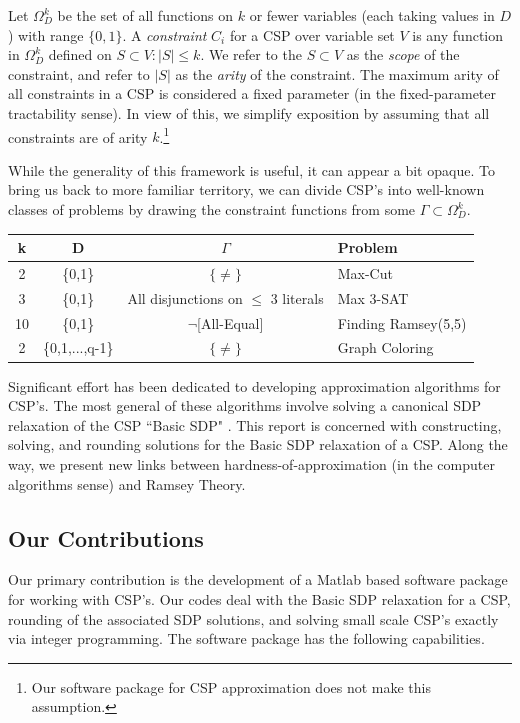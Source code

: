 \documentclass[12pt]{article} %
\begin{document}
Let $\Omega_D^k$ be the set of all functions on $k$ or fewer variables (each taking values in $D$) with range $\{ 0,1 \}$. A \textit{constraint} $C_i$ for a CSP over variable set $V$ is any function in $\Omega_D^k$ defined on $S \subset V : |S| \leq k$. We refer to the $S \subset V$ as the \textit{scope} of the constraint, and refer to $|S|$ as the \textit{arity} of the constraint. The maximum arity of all constraints in a CSP is considered a fixed parameter (in the fixed-parameter tractability sense). In view of this, we simplify exposition by assuming that all constraints are of arity $k$.\footnote{Our software package for CSP approximation does not make this assumption.}

While the generality of this framework is useful, it can appear a bit opaque. To bring us back to more familiar territory, we can divide CSP's into well-known classes of problems by drawing the constraint functions from some $\Gamma \subset \Omega_D^k$.

\begin{center}
\begin{tabular}{c c c l}
\hline
k & D & $\Gamma$ & Problem \\
\hline
2  & \{0,1\} & $\{\neq\}$ & Max-Cut \\
3  & \{0,1\} & All disjunctions on $\leq $ 3 literals & Max 3-SAT \\
10 & \{0,1\} & $\neg$[All-Equal] & Finding Ramsey(5,5) \\
2  & \{0,1,...,q-1\} & $\{\neq\}$ & Graph Coloring \\
\hline
\end{tabular}
\end{center}

Significant effort has been dedicated to developing approximation algorithms for CSP's. The most general of these algorithms involve solving a canonical SDP relaxation of the CSP ``Basic SDP" \cite{raghavendra2008optimal}. This report is concerned with constructing, solving, and rounding solutions for the Basic SDP relaxation of a CSP. Along the way, we present new links between hardness-of-approximation (in the computer algorithms sense) and Ramsey Theory.


\subsection{Our Contributions}
 
Our primary contribution is the development of a Matlab based software package for working with CSP's. Our codes deal with the Basic SDP relaxation for a CSP, rounding of the associated SDP solutions, and solving small scale CSP's exactly via integer programming. The software package has the following capabilities.
\end{document}
